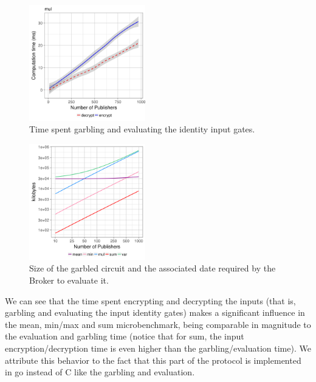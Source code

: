 \begin{figure}
  \includegraphics[width=0.45\textwidth]{plots/enc_dec_inputs.png}
  \caption{Time spent garbling and evaluating the identity input gates.}
  \label{micro-inputs}
\end{figure}



\begin{figure}
  \includegraphics[width=0.45\textwidth]{plots/size_log.png}
  \caption{Size of the garbled circuit and the associated date required by the
  Broker to evaluate it.}
  \label{micro-sizes}
\end{figure}

We can see that the time spent encrypting and decrypting the inputs (that is,
garbling and evaluating the input identity gates) makes a significant influence
in the mean, min/max and sum microbenchmark, being comparable in magnitude to
the evaluation and garbling time (notice that for sum, the input
encryption/decryption time is even higher than the garbling/evaluation time).
We attribute this behavior to the fact that this part of the protocol is
implemented in go instead of C like the garbling and evaluation.

